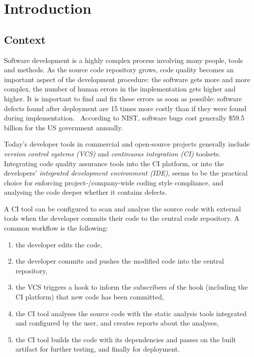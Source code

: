 \chapter{Introduction}


\section{Context}

Software development is a highly complex process involving many people, tools and methods. As the source code repository grows, code quality becomes an important aspect of the development procedure: the software gets more and more complex, the number of human errors in the implementation gets higher and higher. It is important to find and fix these errors as soon as possible: software defects found after deployment are 15 times more costly than if they were found during implementation.~\cite{dawson2010integrating} According to NIST, software bugs cost generally \$59.5 billion for the US government annually.~\cite{tassey2002economic}

Today's developer tools in commercial and open-source projects generally include \emph{version control systems (VCS)} and \emph{continuous integration (CI)} toolsets.~\cite{hilton2016usage, fowlerCI} Integrating code quality assurance tools into the CI platform, or into the developers' \emph{integrated development environment (IDE)}, seems to be the practical choice for enforcing project-/company-wide coding style compliance, and analysing the code deeper whether it contains defects.

A CI tool can be configured to scan and analyse the source code with external tools when the developer commits their code to the central code repository. A common workflow is the following:

\begin{enumerate}
\item the developer edits the code,
\item the developer commits and pushes the modified code into the central repository,
\item the VCS triggers a hook to inform the subscribers of the hook (including the CI platform) that new code has been committed,
\item the CI tool analyses the source code with the static analysis tools integrated and configured by the user, and creates reports about the analyses,
\item the CI tool builds the code with its dependencies and passes on the built artifact for further testing, and finally for deployment.
\end{enumerate}

